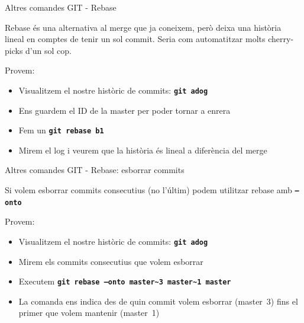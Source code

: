 \documentclass[10pt,xcolor={rgb}]{beamer}
\begin{document}
    \begin{frame}[fragile]{Altres comandes GIT - Rebase}

      Rebase és una alternativa al merge que ja coneixem, però deixa una història lineal en comptes de tenir un sol commit.  Seria com automatitzar molts cherry-picks d'un sol cop.
      \begin{block}{Provem:}
      \begin{itemize}
        \item Visualitzem el nostre històric de commits: \texttt{\textbf{git adog}}
        \item Ens guardem el ID de la master per poder tornar a enrera
        \item Fem un \texttt{\textbf{git rebase b1}}
        \item Mirem el log i veurem que la història és lineal a diferència del merge
      \end{itemize}
      \end{block}
    \end{frame}

    \begin{frame}[fragile]{Altres comandes GIT - Rebase: esborrar commits}

      Si volem esborrar commits consecutius (no l'últim) podem utilitzar rebase amb \texttt{\textbf{--onto}}
      \begin{block}{Provem:}
      \begin{itemize}
        \item Visualitzem el nostre històric de commits: \texttt{\textbf{git adog}}
        \item Mirem els commits consecutius que volem esborrar
        \item Executem \texttt{\textbf{git rebase --onto master\textasciitilde{}3 master\textasciitilde{}1 master}}
        \item La comanda ens indica des de quin commit volem esborrar (master~3) fins el primer que volem mantenir (master~1)
      \end{itemize}
      \end{block}
    \end{frame}
\end{document}
